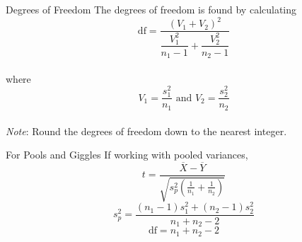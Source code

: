 \documentclass[t]{beamer}
\begin{document}
\begin{frame}{Degrees of Freedom}
The degrees of freedom is found by calculating
\[\text{df} = \dfrac{\left(V_1+V_2\right)^2}{\dfrac{V_1^2}{n_1-1} + \dfrac{V_2^2}{n_2-1}}\]
\newline\\
where
\[V_1 = \frac{s_1^2}{n_1} \text{ and } V_2 = \frac{s_2^2}{n_2}\]
\newline\\
\emph{Note}: Round the degrees of freedom down to the nearest integer.
\end{frame}

\begin{frame}{For Pools and Giggles}
If working with pooled variances,
\[t = \frac{\overline{X}-\overline{Y}}{\sqrt{s_p^2\left(\frac{1}{n_1}+\frac{1}{n_2}\right)}}\]
\bigskip
\[s_p^2 = \frac{(n_1-1)s_1^2+(n_2-1)s_2^2}{n_1+n_2-2}\]
\bigskip
\[\text{df} = n_1+n_2-2\]
\end{frame}
\end{document}
